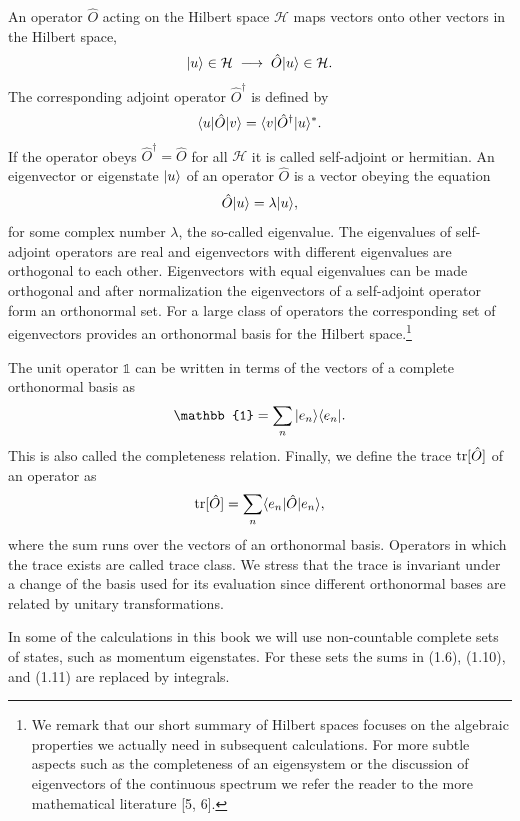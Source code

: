 An operator $\hat{O}$ acting on the Hilbert space $\mathcal{H}$ maps vectors
onto other vectors in the Hilbert space,
\begin{equation}
  |u\rangle\in\mathcal{H} \;\longrightarrow\; \hat{O}|u\rangle\in\mathcal{H}.
\end{equation}
The corresponding adjoint operator $\hat{O}^\dagger$ is defined by
\begin{equation}
  \langle u|\hat{O}|v\rangle = \langle v|\hat{O}^\dagger|u\rangle^*.
\end{equation}
If the operator obeys $\hat{O}^\dagger = \hat{O}$ for all $\mathcal{H}$ it is
called self-adjoint or hermitian. An eigenvector or eigenstate $|u\rangle$ of an
operator $\hat{O}$ is a vector obeying the equation
\begin{equation}
  \hat{O}|u\rangle = \lambda|u\rangle,
\end{equation}
for some complex number $\lambda$, the so-called eigenvalue. The eigenvalues of
self-adjoint operators are real and eigenvectors with different eigenvalues are
orthogonal to each other. Eigenvectors with equal eigenvalues can be made
orthogonal and after normalization the eigenvectors of a self-adjoint operator
form an orthonormal set. For a large class of operators the corresponding set
of eigenvectors provides an orthonormal basis for the Hilbert space.\footnote{We
remark that our short summary of Hilbert spaces focuses on the algebraic
properties we actually need in subsequent calculations. For more subtle aspects
such as the completeness of an eigensystem or the discussion of eigenvectors of
the continuous spectrum we refer the reader to the more mathematical literature
[5, 6].}

The unit operator $\mathbb{1}$ can be written in terms of the vectors of a
complete orthonormal basis as
\begin{equation}
  \mathbb{1} = \sum_n \ket{e_n}\bra{e_n}.
\end{equation}
This is also called the completeness relation. Finally, we define the trace
$\operatorname{tr}[\hat{O}]$ of an operator as
\begin{equation}
  \operatorname{tr}[\hat{O}] = \sum_n \langle e_n|\hat{O}|e_n\rangle,
\end{equation}
where the sum runs over the vectors of an orthonormal basis. Operators in which
the trace exists are called trace class. We stress that the trace is invariant
under a change of the basis used for its evaluation since different orthonormal
bases are related by unitary transformations.

In some of the calculations in this book we will use non-countable complete
sets of states, such as momentum eigenstates. For these sets the sums in (1.6),
(1.10), and (1.11) are replaced by integrals.


